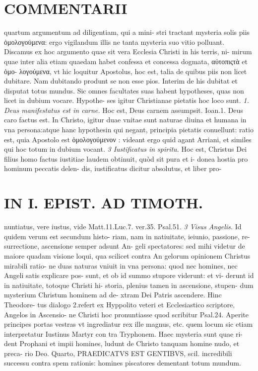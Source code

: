 \documentclass{article}
\begin{document}
\begin{pages}
\section*{COMMENTARII }\pstart quartum argumentum ad diligentiam, qui a mini- stri tractant mysteria solis piis ὁμολογούμενα: ergo vigilandum illis ne tanta mysteria suo vitio polluant. Discamus ex hoc argumento quae sit vera Ecclesia Christi in his terris, ni- mirum quae inter alia etiam quaedam habet confessa et concessa dogmata, αὐτοπιςτὰ et ὁμο- λογούμενα, vt hic loquitur Apostolus, hoc est, talia de quibus piis non licet dubitare. Nam dubitando produnt se non esse pios. Interim de his dubitat et disputat totus mundus. Sic omnes facultates suas habent hypotheses, quas non licet in dubium vocare. Hypothe- ses igitur Christianae pietatis hoc loco sunt.  \pend
\textit{1. Deus manifestatus est in carne. }\pstart Hoc est, Deus carnem assumpsit. Ioan.1. Deus caro factus est. In Christo, igitur duae vnitae sunt naturae diuina et humana in vna persona:atque hanc hypothesin qui negant, principia pietatis conuellunt: ratio est, quia Apostolo est ὁμολογούμενον : videant ergo quid agant Arriani, et similes qui hoc totum in dubium vocant.  \pend
\textit{3 Iustificatus in spiritu. }\pstart Hoc est, Christus Dei filius homo factus iustitiae laudem obtinuit, quòd sit pura et i- donea hostia pro hominum peccatis delen- dis, iustificatus dicitur absolutus, et liber pro-  \pend
\section*{IN I. EPIST. AD TIMOTH. }
\marginpar{[ p.81 ]}\pstart nuntiatus, vere iustus, vide Matt.11.Luc.7. ver.35. Psal.51.  \pend
\textit{3 Visus Angelis. }\pstart Id quidem verum est secundum histo- riam, nam in natiuitate, ieiunio, passione, re- surrectione, ascensione semper adsunt An- geli spectatores: sed mihi videtur de maiore quadam visione loqui, qua scilicet contra An gelorum opinionem Christus mirabili ratio- ne duas naturas vniuit in vna persona: quod nec homines, nec Angeli satis explicare pos- sunt, et ob id summo stupore viderunt: et vi- derunt id in natiuitate, totoque Christi hi- storia, plenius tamen in ascensione, stupen- dum mysterium Christum hominem ad de- xtram Dei Patris ascendere. Hinc Theodore- tus dialogo 2.refert ex Hyppolito veteri et Ecclesiastico scriptore, Angelos in Ascensio- ne Christi hoc pronuntiasse quod scribitur Psal.24. Aperite principes portas vestras vt ingrediatur rex ille magnus, etc. quem locum sic etiam interpretatur Iustinus Martyr con tra Tryphonem. Haec mysteria sunt quae ri- dent Prophani et impii homines, ludunt de Christo tanquam homine nudo, et preca- rio Deo.  \pend\pstart Quarto, PRAEDICATVS EST GENTIBVS, scil. incredibili successu contra spem rationis: homines piscatores dementant totum mundum.  \pend
\marginpar{[ p.82 ]}

\end{pages}
\end{document}
